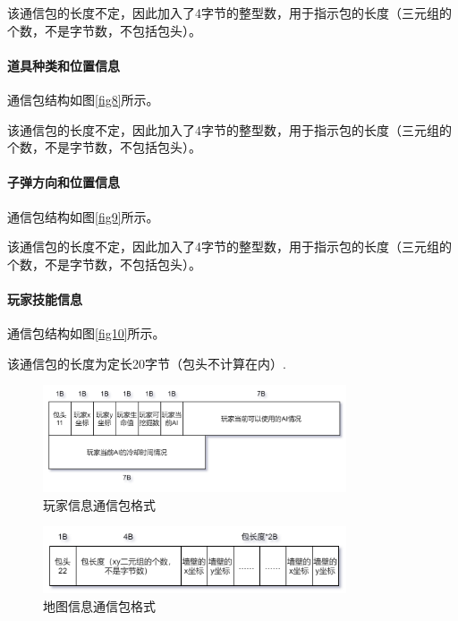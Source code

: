 \documentclass{SCIS2022cn}
\begin{document}
该通信包的长度不定，因此加入了4字节的整型数，用于指示包的长度（三元组的个数，不是字节数，不包括包头）。

\paragraph{道具种类和位置信息}

通信包结构如图\ref{fig8}所示。

该通信包的长度不定，因此加入了4字节的整型数，用于指示包的长度（三元组的个数，不是字节数，不包括包头）。

\paragraph{子弹方向和位置信息}

通信包结构如图\ref{fig9}所示。

该通信包的长度不定，因此加入了4字节的整型数，用于指示包的长度（三元组的个数，不是字节数，不包括包头）。

\paragraph{玩家技能信息}

通信包结构如图\ref{fig10}所示。

该通信包的长度为定长20字节（包头不计算在内）.

\begin{figure}[!t]
\centering
\includegraphics*[width=0.8\textwidth]{pics/infoPackage.png}
\caption{玩家信息通信包格式}
\label{fig5}
\end{figure}

\begin{figure}[!t]
\centering
\includegraphics*[width=0.8\textwidth]{pics/wallPackage.png}
\caption{地图信息通信包格式}
\label{fig6}
\end{figure}
\end{document}
